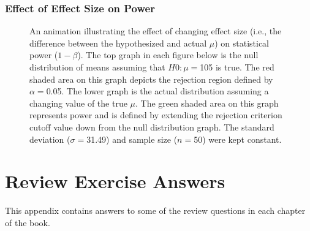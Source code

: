 \documentclass[10pt,openany]{book}\usepackage[]{graphicx}\usepackage[]{color}
\newenvironment{knitrout}{}{} %
\begin{document}
\subsection{Effect of Effect Size on Power}
\begin{knitrout}
\color{fgcolor}



















\begin{figure}[hbtp]

{\centering {}

}

\caption[An animation illustrating the effect of changing effect size (i.e., the difference between the hypothesized and actual $\mu$) on statistical power ($1-\beta$)]{An animation illustrating the effect of changing effect size (i.e., the difference between the hypothesized and actual $\mu$) on statistical power ($1-\beta$).  The top graph in each figure below is the null distribution of means assuming that $H0:\mu=$105 is true.  The red shaded area on this graph depicts the rejection region defined by $\alpha=$0.05.  The lower graph is the actual distribution assuming a changing value of the true $\mu$.  The green shaded area on this graph represents power and is defined by extending the rejection criterion cutoff value down from the null distribution graph.  The standard deviation ($\sigma=$31.49) and sample size ($n=$50) were kept constant.}\label{fig:pwrAnimM}
\end{figure}


\end{knitrout}



\chapter{Review Exercise Answers}
\vspace{-60pt}
This appendix contains answers to some of the review questions in each chapter of the book.

\renewcommand{\labelenumi}{(\alph{enumi})}
\end{document}
